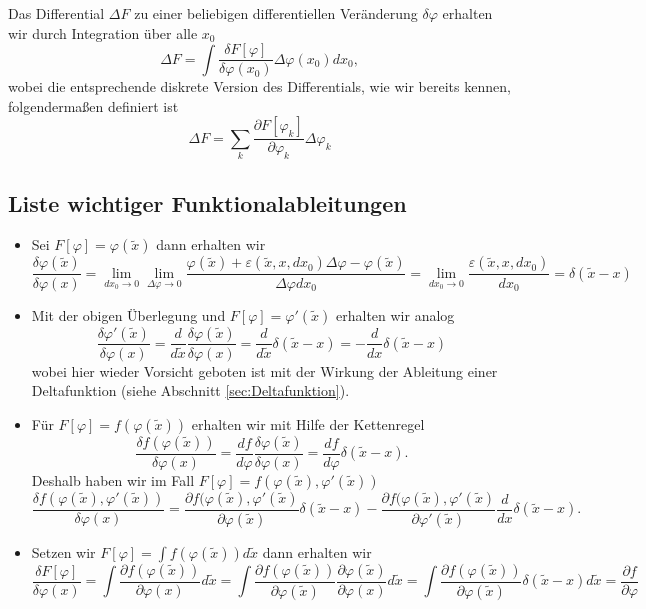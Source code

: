 %
Das Differential $\Delta F$ zu einer beliebigen differentiellen Veränderung
$\delta\varphi$ erhalten wir durch Integration über alle $x_0$
\begin{equation}\label{eq:DifferentialVariation}
  \Delta F = \int\frac{\delta F[\varphi]}{\delta\varphi(x_0)}\Delta\varphi(x_0)dx_0,
\end{equation}
wobei die entsprechende diskrete Version des Differentials, wie wir bereits
kennen, folgendermaßen definiert ist
\begin{equation}\label{eq:DifferentialMultiD}
    \Delta F = \sum\limits_k \frac{\partial F[\varphi_k]}{\partial\varphi_k}\Delta\varphi_k
\end{equation}
%
\subsection{Liste wichtiger Funktionalableitungen}\label{sec:WichtigeAbleitungen}
\begin{itemize}
  \item Sei $F[\varphi]=\varphi(\tilde{x})$ dann erhalten wir
    \[
      \frac{\delta\varphi(\tilde{x})}{\delta\varphi(x)}=\lim_{dx_0\rightarrow 0}\lim_{\Delta\varphi\rightarrow 0}
      \frac{\varphi(\tilde{x})+\varepsilon(\tilde{x},x,dx_0)\Delta\varphi-\varphi(\tilde{x})}{\Delta\varphi dx_0}=\lim_{dx_0\rightarrow 0}\frac{\varepsilon(\tilde{x},x,dx_0)}{dx_0}=\delta(\tilde{x}-x)
    \]
  \item Mit der obigen Überlegung und $F[\varphi]=\varphi'(\tilde{x})$ erhalten wir analog
    \[
      \frac{\delta\varphi'(\tilde{x})}{\delta\varphi(x)}=\frac{d}{d\tilde{x}} \frac{\delta\varphi(\tilde{x})}{\delta\varphi(x)}=\frac{d}{d\tilde{x}}\delta(\tilde{x}-x)=-\frac{d}{dx}\delta(\tilde{x}-x)
    \]
    wobei hier wieder Vorsicht geboten ist mit der Wirkung der Ableitung einer
    Deltafunktion (siehe Abschnitt \ref{sec:Deltafunktion}).
  \item Für $F[\varphi]=f(\varphi(\tilde{x}))$ erhalten wir mit Hilfe der Kettenregel
    \[
      \frac{\delta f(\varphi(\tilde{x}))}{\delta\varphi(x)}
      =\frac{df}{d\varphi}\frac{\delta \varphi(\tilde{x})}{\delta\varphi(x)}
      =\frac{df}{d\varphi}\delta(\tilde{x}-x).
    \]
    Deshalb haben wir im Fall  $F[\varphi]=f(\varphi(\tilde{x}),\varphi'(\tilde{x}))$
      \[
	\frac{\delta f(\varphi(\tilde{x}),\varphi'(\tilde{x}))}{\delta\varphi(x)}=
	\frac{\partial f(\varphi(\tilde{x}),\varphi'(\tilde{x})}{\partial\varphi(\tilde{x})}\delta(\tilde{x}-x)-
	  \frac{\partial f(\varphi(\tilde{x}),\varphi'(\tilde{x})}{\partial\varphi'(\tilde{x})}\frac{d}{dx}\delta(\tilde{x}-x).
    \]
  \item Setzen wir $F[\varphi]=\int f(\varphi(\tilde{x}))d\tilde{x}$ dann erhalten  wir 
    \[
      \frac{\delta F[\varphi]}{\delta\varphi(x)}=\int \frac{\partial f(\varphi(\tilde{x}))}{\partial\varphi(x)}d\tilde{x}=
      \int\frac{\partial f(\varphi(\tilde{x}))}{\partial\varphi(\tilde{x})}\frac{\partial\varphi(\tilde{x})}{\partial\varphi(x)}d\tilde{x}=
      \int\frac{\partial f(\varphi(\tilde{x}))}{\partial\varphi(\tilde{x})}\delta(\tilde{x}-x)d\tilde{x}=\frac{\partial f}{\partial\varphi}
    \]
\end{itemize}

